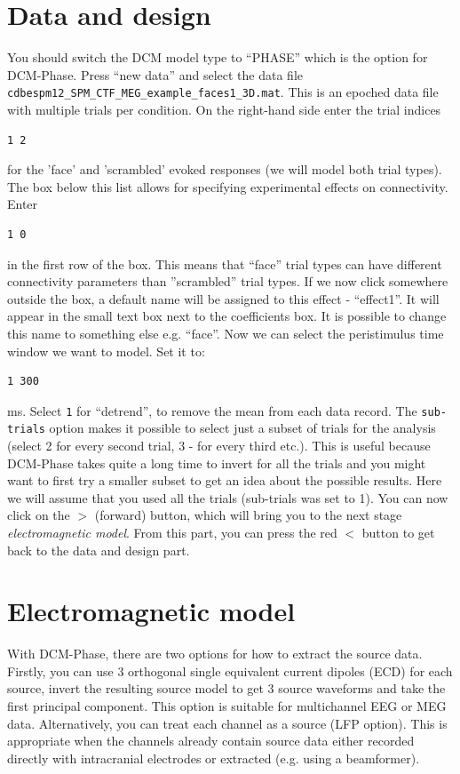 \section{Data and design}

 You should switch the DCM model type to ``PHASE'' which is the option for DCM-Phase. Press ``new data'' and select the data file \texttt{cdbespm12\_\-SPM\_\-CTF\_\-MEG\_\-example\_\-faces1\_\-3D.mat}. This is an epoched data file with multiple trials per condition.  On the right-hand side enter the trial indices
\begin{verbatim}
1 2
\end{verbatim} 
for the 'face' and 'scrambled' evoked responses (we will model both trial types).
 The box below this list allows for specifying experimental effects on connectivity. Enter 
\begin{verbatim}
1 0
\end{verbatim} 
in the first row of the box. This means that ``face'' trial types can have different connectivity parameters than ''scrambled'' trial types. If we now click somewhere outside the box, a default name will be assigned to this effect - ``effect1''. It will appear in the small text box next to the coefficients box. It is possible to change this name to something else e.g. ``face''. Now we can select the peristimulus time window we want to model. 
Set it to:
\begin{verbatim}
1 300
\end{verbatim} 
ms. Select \texttt{1} for ``detrend'', to  remove the mean from each data record.  The \texttt{sub-trials} option makes it possible to select just a subset of trials for the analysis (select 2 for every second trial, 3 - for every third etc.). This is useful because DCM-Phase takes quite a long time to invert for all the trials and you might want to first try a smaller subset to get an idea about the possible results. Here we will assume that you used all the trials (sub-trials was set to 1). You can now click on the $>$ (forward) button, which will bring you to the next stage \textit{electromagnetic model}. From this part, you can press the red $<$ button to get back to the data and design part.

\section{Electromagnetic model}

With DCM-Phase, there are two options for how to extract the source data. Firstly, you can use 3 orthogonal single equivalent current dipoles (ECD) for each source, invert the resulting source model to get 3 source waveforms and take the first principal component. This option is suitable for multichannel EEG or MEG data. Alternatively, you can treat each channel as a source (LFP option). This is appropriate when the channels already contain source data either recorded directly with intracranial electrodes or extracted (e.g. using a beamformer). 

